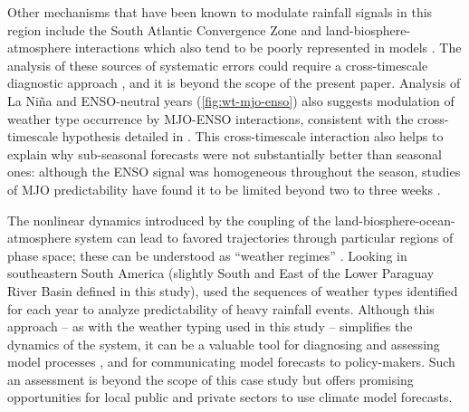 \documentclass[twocol]{ametsoc}
\begin{document}
Other mechanisms that have been known to modulate rainfall signals in this region include the South Atlantic Convergence Zone \citep{Carvalho2004,Munoz2015,Munoz2016} and land-biosphere-atmosphere interactions \citep{Grimm:2000bt,Grimm:2009bq} which also tend to be poorly represented in models \citep{Green:2017cs,Koster:2004ge}.
The analysis of these sources of systematic errors could require a cross-timescale diagnostic approach \citep{Munoz:2017ct}, and it is beyond the scope of the present paper.
Analysis of La Ni\~na and ENSO-neutral years (\cref{fig:wt-mjo-enso}) also suggests modulation of weather type occurrence by MJO-ENSO interactions, consistent with the cross-timescale hypothesis detailed in \citet{Munoz2015}.
This cross-timescale interaction also helps to explain why sub-seasonal forecasts were not substantially better than seasonal ones: although the ENSO signal was homogeneous throughout the season, studies of MJO predictability have found it to be limited beyond two to three weeks \citep{Ding:2010em,Vitart:2014bt,Kim:2014bt}.

The nonlinear dynamics introduced by the coupling of the land-biosphere-ocean-atmosphere system can lead to favored trajectories through particular regions of phase space; these can be understood as ``weather regimes'' \citep[see][for a comprehensive discussion]{Hannachi2017}.
Looking in southeastern South America (slightly South and East of the Lower Paraguay River Basin defined in this study), \citet{Munoz2016} used the sequences of weather types identified for each year to analyze predictability of heavy rainfall events.
Although this approach -- as with the weather typing used in this study -- simplifies the dynamics of the system, it can be a valuable tool for diagnosing and assessing model processes \citep{Munoz:2017ct}, and for communicating model forecasts to policy-makers.
Such an assessment is beyond the scope of this case study but offers promising opportunities for local public and private sectors to use climate model forecasts.
\end{document}
